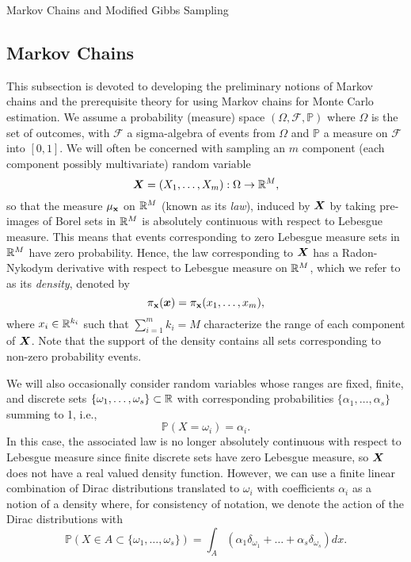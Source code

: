 \begin{chapter}{Markov Chains and Modified Gibbs Sampling}
  \subsection{Markov Chains}
This subsection is devoted to developing the preliminary notions of Markov chains and the prerequisite theory for using Markov chains for Monte Carlo estimation. 
We assume a probability (measure) space $(\Omega,\mathcal F,\mathbb P)$ where $\Omega$ is the set of outcomes, with $\mathcal F$ a sigma-algebra of events from $\Omega$ and $\mathbb P$ a measure on $\mathcal F$ into $[0,1]$.
We will often be concerned with sampling an $m$ component (each component possibly multivariate) random variable 
\begin{equation}
\mbox{\boldmath$X$} = (X_1,\dots,X_m):\Omega \to \mathbb R^M,
\end{equation} 
  so that the measure $\mu_{\textsc{\bf{x}}}$ on $\mathbb R^M$ (known as its \emph{law}), induced by $\mbox{\boldmath$X$}$ by taking pre-images of Borel sets in $\mathbb R^M$ is absolutely continuous with respect to Lebesgue measure. 
This means that events corresponding to zero Lebesgue measure sets in $\mathbb R^M$ have zero probability.
Hence, the law corresponding to $\mbox{\boldmath$X$}$ has a Radon-Nykodym derivative with respect to Lebesgue measure on $\mathbb R^M$, which we refer to as its \emph{density}, denoted by 
\begin{equation}
  \pi_{\textsc{\bf{x}}}(\mbox{\boldmath$x$}) = \pi_{\textsc{\bf{x}}}(x_1,\dots,x_m),
\end{equation} where $x_i \in \mathbb R^{k_i}$ such that $\sum_{i=1}^m k_i = M$ characterize the range of each component of $\mbox{\boldmath$X$}$.
Note that the support of the density contains all sets corresponding to non-zero probability events.

We will also occasionally consider random variables whose ranges are fixed, finite, and discrete sets $\{\omega_1,\dots,\omega_s\} \subset \mathbb R$ with corresponding probabilities $\{\alpha_1,\dots,\alpha_s\}$ summing to 1, i.e.,
\begin{equation} 
  \mathbb P( X = \omega_i ) = \alpha_i.
\end{equation}
In this case, the associated law is no longer absolutely continuous with respect to Lebesgue measure since finite discrete sets have zero Lebesgue measure, so $\mbox{\boldmath$X$}$ does not have a real valued density function.
However, we can use a finite linear combination of Dirac distributions translated to $\omega_i$ with coefficients $\alpha_i$ as a notion of a density where, for consistency of notation, we denote the action of the Dirac distributions with
\begin{equation} \label{eq:diracMeasure}
  \mathbb P( X \in A \subset \{\omega_1,\dots,\omega_s\} ) =  \int_A \left(\alpha_1 \delta_{\omega_1}+\dots+\alpha_s \delta_{\omega_s}\right) dx.
\end{equation}


\end{chapter}
